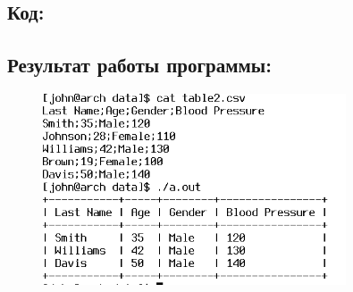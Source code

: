 \documentclass[14pt,a4paper]{article}
\begin{document}
\subsection{Код:}

\newpage
\subsection{Результат работы программы:}
\begin{figure}[h]
  \centering
  \includegraphics[width=0.8\textwidth]{data/demo15_3.png} %
\end{figure}
\end{document}
